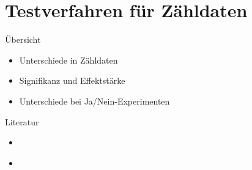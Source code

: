 \section[Zähldaten]{Testverfahren für Zähldaten}

\begin{frame}
  {Übersicht}
  \begin{itemize}[<+->]
    \item Unterschiede in Zähldaten 
    \item Signifikanz und Effektstärke
    \item Unterschiede bei Ja\slash Nein-Experimenten
  \end{itemize}
\end{frame}

\begin{frame}
  {Literatur}
  \begin{itemize}
    \item \cite{GravetterWallnau2007}
    \item \cite{BortzLienert2008}
  \end{itemize}
\end{frame}

%


